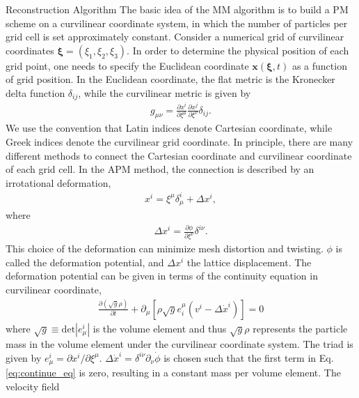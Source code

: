 \begin{section}{Reconstruction Algorithm}
  \label{sec:reconstruction}
  The basic idea of the MM algorithm is to build a PM scheme on a
  curvilinear coordinate system, in which the number of particles per
  grid cell is set approximately constant.  Consider a numerical grid
  of curvilinear coordinates
  $\bm{\xi}=\left(\xi_1,\xi_2,\xi_3\right)$.  In order to determine
  the physical position of each grid point, one needs to specify the
  Euclidean coordinate $\bm{x}(\bm{\xi},t)$ as a function of grid
  position. In the Euclidean coordinate, the flat metric is the
  Kronecker delta function $\delta_{ij}$, while the curvilinear metric
  is given by
  \begin{align}
    g_{\mu\nu}=\frac{\partial x^i}{\partial \xi ^\mu} \frac{\partial x^j}{\partial \xi ^\nu}\delta_{ij}.
  \end{align}
  We use the convention that Latin indices denote Cartesian
  coordinate, while Greek indices denote the curvilinear grid
  coordinate.  In principle, there are many different methods to
  connect the Cartesian coordinate and curvilinear coordinate of each
  grid cell. In the APM method, the connection is described by an
  irrotational deformation,
  \begin{align}
    x^i=\xi ^\mu \delta ^i _\mu + \Delta x^i,
  \end{align}
  where
  \begin{align}
    \label{eq:disp}
    \Delta x^i=\frac{\partial \phi}{\partial \xi ^ \nu}\delta ^{i \nu} .
  \end{align}
  This choice of the deformation can minimize mesh distortion and
  twisting.  $\phi$ is called the deformation potential, and
  $\Delta x^i$ the lattice displacement.  The deformation potential
  can be given in terms of the continuity equation in curvilinear
  coordinate,
  \begin{align}
    \label{eq:continue_eq}
    \frac{\partial (\sqrt{g} \rho) }{\partial t}+\partial_\mu \left[\rho \sqrt{g} e^\mu _i \left(v^i - \Delta \dot{x}^i \right) \right] =0
  \end{align}
  where $\sqrt{g} \equiv \mathrm{det}\left| e^i_\mu\right|$ is the
  volume element and thus $\sqrt{g} \rho$ represents the particle mass
  in the volume element under the curvilinear coordinate system.  The
  triad is given by $e^i_\mu = \partial x^i / \partial \xi ^ \mu$.
  $\Delta \dot{x}^i=\delta ^{i\nu}\partial _\nu \dot{\phi}$ is chosen
  such that the first term in Eq.\ref{eq:continue_eq} is zero,
  resulting in a constant mass per volume element.  The velocity field

\end{section}
